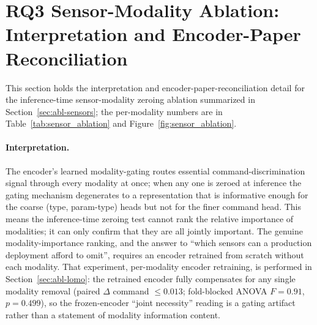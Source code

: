 \documentclass[11pt,a4paper]{article}
\begin{document}
\section{RQ3 Sensor-Modality Ablation: Interpretation and Encoder-Paper Reconciliation}
\label{app:sensor-detail}

This section holds the interpretation and encoder-paper-reconciliation detail
for the inference-time sensor-modality zeroing ablation summarized in
Section~\ref{sec:abl-sensors}; the per-modality numbers are in
Table~\ref{tab:sensor_ablation} and Figure~\ref{fig:sensor_ablation}.

\paragraph{Interpretation.} The encoder's learned modality-gating routes essential command-discrimination signal through every modality at once; when any one is zeroed at inference the gating mechanism degenerates to a representation that is informative enough for the coarse (type, param-type) heads but not for the finer command head. This means the inference-time zeroing test cannot rank the relative importance of modalities; it can only confirm that they are all jointly important. The genuine modality-importance ranking, and the answer to ``which sensors can a production deployment afford to omit'', requires an encoder retrained from scratch without each modality. That experiment, per-modality encoder retraining, is performed in Section~\ref{sec:abl-lomo}: the retrained encoder fully compensates for any single modality removal (paired $\Delta$ command $\le 0.013$; fold-blocked ANOVA $F=0.91$, $p=0.499$), so the frozen-encoder ``joint necessity'' reading is a gating artifact rather than a statement of modality information content.
\end{document}
